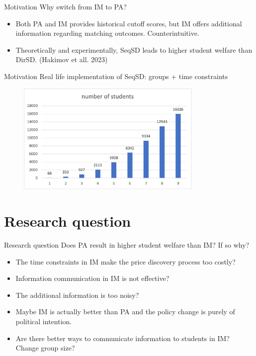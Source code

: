 \documentclass[dvipsnames,mathserif]{beamer}
\begin{document}
{\begin{frame}{Motivation}
\large Why switch from IM to PA?
\vspace{0.5cm}
    \begin{itemize}
        \item Both PA and IM provides historical cutoff scores, but IM offers additional information regarding matching outcomes. Counterintuitive.\\
        \vspace{0.2cm}
        \item Theoretically and experimentally, SeqSD leads to higher student welfare than DirSD. (Hakimov et all. 2023)
    \end{itemize}
\end{frame}
\begin{frame}{Motivation}
\large Real life implementation of SeqSD: groups + time constraints
\begin{figure}[h!]
\centering
\includegraphics[width=0.8\textwidth]{1.png}
\end{figure}
\end{frame}




\section{Research question}
\begin{frame}{Research question}
\large Does PA result in higher student welfare than IM? If so why?
\vspace{0.5cm}
    \begin{itemize}
    	\item The time constraints in IM make the price discovery process too costly? 
        \vspace{0.2cm}
        \item Information communication in IM is not effective? 
        \vspace{0.2cm}
        \item The additional information is too noisy? 
        \vspace{0.2cm}
        \item Maybe IM is actually better than PA and the policy change is purely of political intention. 
        \vspace{0.2cm}
        \item Are there better ways to communicate information to students in IM? Change group size?
    \end{itemize}
\end{frame}

}
\end{document}

